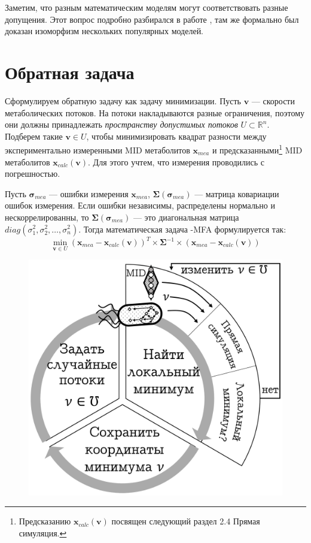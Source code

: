 \documentclass[14pt, a4paper]{extreport}
\begin{document}
Заметим, что разным математическим моделям могут соответствовать разные допущения. Этот вопрос подробно разбирался в работе \cite{formalizm_2017}, там же формально был доказан изоморфизм нескольких популярных моделей.
\clearpage


\section{Обратная задача}

Сформулируем обратную задачу как задачу минимизации. Пусть $\boldsymbol{v}$ --- скорости метаболических потоков. На потоки накладываются разные ограничения, поэтому они должны принадлежать \emph{пространству допустимых потоков} $U \subset \mathbb{R}^n$. Подберем такие $\boldsymbol{v} \in U$, чтобы минимизировать квадрат разности между экспериментально измеренными MID метаболитов $\boldsymbol{x}_{mea}$ и предсказанными\footnote{Предсказанию $\boldsymbol{x}_{calc}(\boldsymbol{v})$ посвящен следующий раздел 2.4 Прямая симуляция.} MID метаболитов $\boldsymbol{x}_{calc}(\boldsymbol{v})$. Для этого учтем, что измерения проводились с погрешностью. 

Пусть $\boldsymbol{\sigma}_{mea}$ --- ошибки измерения $\boldsymbol{x}_{mea}$, $\boldsymbol{\Sigma}(\boldsymbol{\sigma}_{mea})$ --- матрица ковариации ошибок измерения. Если ошибки независимы, распределены нормально и нескоррелированны, то $\boldsymbol{\Sigma}(\boldsymbol{\sigma}_{mea})$ --- это диагональная матрица \\$diag(\sigma_{1}^2, \sigma_{2}^{2}, \dots, \sigma_{n}^2)$. Тогда математическая задача -MFA формулируется так:
$$\min_{\boldsymbol{v} \in U}{ } (\boldsymbol{x}_{mea} - \boldsymbol{x}_{calc}(\boldsymbol{v}))^T \times \boldsymbol{\Sigma}^{-1} \times (\boldsymbol{x}_{mea} - \boldsymbol{x}_{calc}(\boldsymbol{v}))$$


\begin{figure}
	\includegraphics[width=1\linewidth]{inverse_problem.png}
	\label{inverse_problem}
\end{figure}
\end{document}
